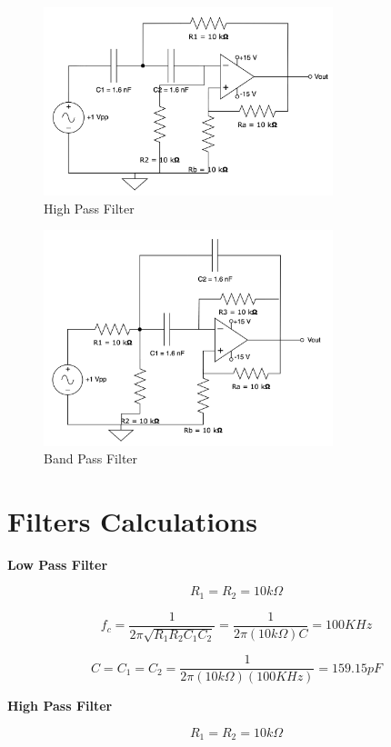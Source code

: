 \documentclass[CMPE]{KGCOEReport}
\begin{document}
\begin{figure}[H]
    \centering
    \includegraphics[width=0.75\textwidth]{7.png}
    \caption{High Pass Filter}
    \label{fig:part7}
\end{figure}

\begin{figure}[H]
    \centering
    \includegraphics[width=0.75\textwidth]{8.png}
    \caption{Band Pass Filter}
    \label{fig:part8}
\end{figure}

\section*{Filters Calculations}

\textbf{Low Pass Filter}

\[
    R_1 = R_2 = 10k\Omega
\]

\[
    f_c = \frac{1}{2\pi \sqrt{R_1R_2C_1C_2}} = \frac{1}{2\pi (10k\Omega)C} = 100 KHz
\]

\[
    C = C_1 = C_2 = \frac{1}{2\pi (10k\Omega)(100KHz)} = 159.15 pF
\]

\textbf{High Pass Filter}

\[
    R_1 = R_2 = 10k\Omega
\]
\end{document}
